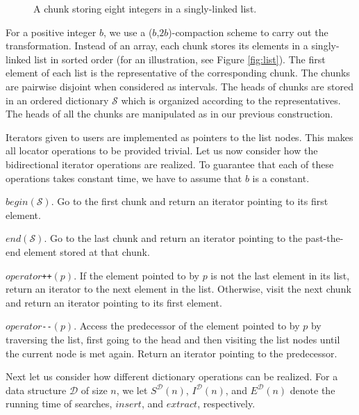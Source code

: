 \documentclass{DIKU-article}
\newcommand{\Insert}{\mbox{$\mathit{insert}$}}
\newcommand{\Extract}{\mbox{$\mathit{extract}$}}
\newcommand{\Begin}{\mbox{$\mathit{begin}$}}
\newcommand{\End}{\mbox{$\mathit{end}$}}
\newcommand{\Operator}{\mbox{$\mathit{operator}$}}
\begin{document}
\begin{figure}
\begin{center}

\end{center}
\caption{A chunk storing eight integers in a singly-linked list.\label{fig:heap}}
\end{figure}

For a positive integer $b$, we use a ($b$,$2b$)-compaction scheme to
carry out the transformation. Instead of an array, each chunk stores
its elements in a singly-linked list in sorted order (for an
illustration, see Figure \ref{fig:list}).  The first element of each
list is the representative of the corresponding chunk.  The chunks are
pairwise disjoint when considered as intervals.  The heads of chunks
are stored in an ordered dictionary $\mathcal{S}$ which is organized
according to the representatives.  The heads of all the chunks are
manipulated as in our previous construction.

Iterators given to users are implemented as pointers to the list
nodes. This makes all locator operations to be provided trivial.  Let
us now consider how the bidirectional iterator operations are
realized. To guarantee that each of these operations takes constant
time, we have to assume that $b$ is a constant.

\Begin{}$(\mathcal{S})$. Go to the first chunk and return an iterator
pointing to its first element.

\End{}$(\mathcal{S})$. Go to the last chunk and return an iterator
pointing to the past-the-end element stored at that chunk.

\Operator{}\texttt{++}$(p)$. If the element pointed to by $p$ is not
the last element in its list, return an iterator to the next element
in the list. Otherwise, visit the next chunk and return an iterator
pointing to its first element.

\Operator{}\texttt{-}\texttt{-}$(p)$. Access the predecessor of the
element pointed to by $p$ by traversing the list, first going to the
head and then visiting the list nodes until the current node is
met again. Return an iterator pointing to the predecessor.

Next let us consider how different dictionary operations can be
realized.  For a data structure $\mathcal{D}$ of size $n$, we let
$S^{\mathcal{D}}(n)$, $I^{\mathcal{D}}(n)$, and $E^{\mathcal{D}}(n)$
denote the running time of searches, \Insert{}, and \Extract{},
respectively.
\end{document}
